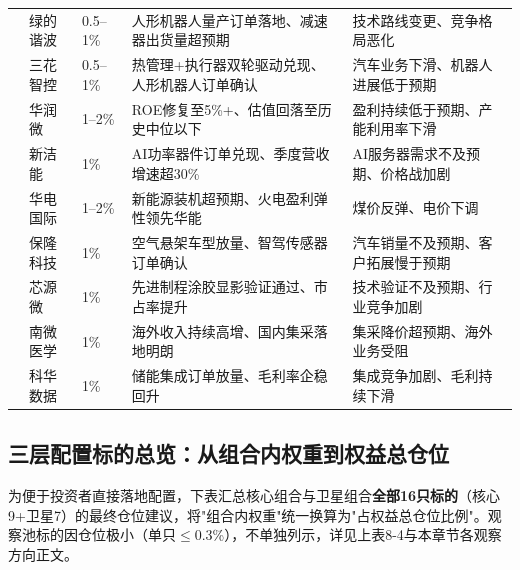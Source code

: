 \begin{exhibitbox}
\begin{tabularx}{\linewidth}{L{2.2cm} L{1.8cm} C{1.0cm} X X}
\midrule
{}
& 绿的谐波 & 0.5--1\% & 人形机器人量产订单落地、减速器出货量超预期 & 技术路线变更、竞争格局恶化 \\
 & 三花智控 & 0.5--1\% & 热管理+执行器双轮驱动兑现、人形机器人订单确认 & 汽车业务下滑、机器人进展低于预期 \\
\midrule
{}
& 华润微 & 1--2\% & ROE修复至5\%+、估值回落至历史中位以下 & 盈利持续低于预期、产能利用率下滑 \\
& 新洁能 & 1\% & AI功率器件订单兑现、季度营收增速超30\% & AI服务器需求不及预期、价格战加剧 \\
& 华电国际 & 1--2\% & 新能源装机超预期、火电盈利弹性领先华能 & 煤价反弹、电价下调 \\
& 保隆科技 & 1\% & 空气悬架车型放量、智驾传感器订单确认 & 汽车销量不及预期、客户拓展慢于预期 \\
& 芯源微 & 1\% & 先进制程涂胶显影验证通过、市占率提升 & 技术验证不及预期、行业竞争加剧 \\
& 南微医学 & 1\% & 海外收入持续高增、国内集采落地明朗 & 集采降价超预期、海外业务受阻 \\
 & 科华数据 & 1\% & 储能集成订单放量、毛利率企稳回升 & 集成竞争加剧、毛利持续下滑 \\
\bottomrule
\end{tabularx}
\end{exhibitbox}

\subsection{三层配置标的总览：从组合内权重到权益总仓位}

为便于投资者直接落地配置，下表汇总核心组合与卫星组合\textbf{全部16只标的}（核心9+卫星7）的最终仓位建议，将"组合内权重"统一换算为"占权益总仓位比例"。观察池标的因仓位极小（单只$\leq$0.3\%），不单独列示，详见上表8-4与本章节各观察方向正文。

